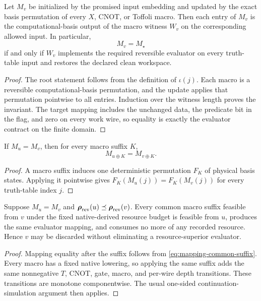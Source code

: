 \begin{lemma}
Let $M_v$ be initialized by the promised input embedding and updated by the exact basis permutation of every $X$, CNOT, or Toffoli macro.  Then each entry of $M_v$ is the computational-basis output of the macro witness $W_v$ on the corresponding allowed input.  In particular,
\begin{equation}
M_v=M_\star
\end{equation}
if and only if $W_v$ implements the required reversible evaluator on every truth-table input and restores the declared clean workspace.
\end{lemma}
\begin{proof}
The root statement follows from the definition of $\iota(j)$.  Each macro is a reversible computational-basis permutation, and the update applies that permutation pointwise to all entries.  Induction over the witness length proves the invariant.  The target mapping includes the unchanged data, the predicate bit in the flag, and zero on every work wire, so equality is exactly the evaluator contract on the finite domain.
\end{proof}

\begin{lemma}
If $M_u=M_v$, then for every macro suffix $K$,
\begin{equation}
M_{u\oplus K}=M_{v\oplus K}.
\label{eq:mapping-common-suffix}
\end{equation}
\end{lemma}
\begin{proof}
A macro suffix induces one deterministic permutation $F_K$ of physical basis states.  Applying it pointwise gives $F_K(M_u(j))=F_K(M_v(j))$ for every truth-table index $j$.
\end{proof}

\begin{theorem}
Suppose $M_u=M_v$ and $\boldsymbol{\rho}_{\mathrm{rev}}(u)\preceq\boldsymbol{\rho}_{\mathrm{rev}}(v)$.  Every common macro suffix feasible from $v$ under the fixed native-derived resource budget is feasible from $u$, produces the same evaluator mapping, and consumes no more of any recorded resource.  Hence $v$ may be discarded without eliminating a resource-superior evaluator.
\end{theorem}
\begin{proof}
Mapping equality after the suffix follows from \eqref{eq:mapping-common-suffix}.  Every macro has a fixed native lowering, so applying the same suffix adds the same nonnegative $T$, CNOT, gate, macro, and per-wire depth transitions.  These transitions are monotone componentwise.  The usual one-sided continuation-simulation argument then applies.
\end{proof}

